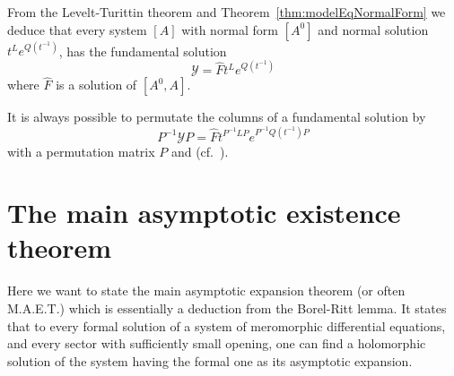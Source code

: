 \begin{cor}
  From the Levelt-Turittin theorem and Theorem~\ref{thm:modelEqNormalForm} we
  deduce that every system $[A]$ with normal form $[A^0]$ and normal solution
  $t^L e^{Q(t^{-1})}$, has the fundamental solution
  \[
    \mathcal{Y}=\hat F t^L e^{Q(t^{-1})}
  \]
  where $\hat F$ is a solution of $[A^0,A]$.
  \begin{s-rem}
    It is always possible to permutate the columns of a fundamental solution by
    \[
      P^{-1}\mathcal{Y}P=\hat F t^{P^{-1}LP} e^{P^{-1}Q(t^{-1})P}
    \]
    with a permutation matrix $P$ and  (cf.\ \cite[73]{Loday2014}).
  \end{s-rem}
\end{cor}

\section{The main asymptotic existence theorem}
\TODO[move] 
\begin{comment}
  \begin{multicols}{2}
    \textbf{Classical:}
    \begin{itemize}
      \item \cite[Thm.4.4.1]{Loday2014}
      \item \cite[Thm.7.10]{van2003galois}{\tiny\cite[Thm.7.12]{van2003galois}}
      \item \cite[Thm.12.1]{wasow2002asymptotic}
      \item \cite[5.3.Thm.1]{Varadarajan96linearmeromorphic}
      \item \cite[207]{Balser2000Formal}: Some historical remarks
      \item \cite[Thm.A]{BJL1979Birkhoff}
    \end{itemize}
  \columnbreak
    \textbf{Sheafical:}
    \begin{itemize}
      \item \cite[Thm.2.3.1]{sabbah_cimpa90}
      \item \cite[Sec.4.4]{Loday2014}
    \end{itemize}
  \end{multicols}
\end{comment}
Here we want to state the main asymptotic expansion theorem (or often M.A.E.T.)
which is essentially a deduction from the Borel-Ritt lemma.
It states that to every formal solution of a system of meromorphic differential
equations, and every sector with sufficiently small opening, one can find a
holomorphic solution of the system having the formal one as its asymptotic
expansion.

